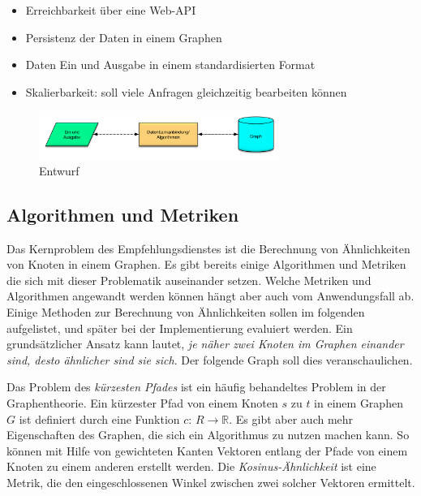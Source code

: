 \begin{itemize}
	\item Erreichbarkeit über eine Web-API 
	\item Persistenz der Daten in einem Graphen	
	\item Daten Ein und Ausgabe in einem standardisierten Format 
	\item Skalierbarkeit: soll viele Anfragen gleichzeitig bearbeiten können
\end{itemize}

\begin{figure}[htb]
 \centering
 \includegraphics[width=0.7\textwidth,angle=0]{abb/Entwurf}
 \caption[Beschreibung]{Entwurf}
\label{fig:Entwurf}
\end{figure}



\subsection{Algorithmen und Metriken}

Das Kernproblem des Empfehlungsdienstes ist die Berechnung von Ähnlichkeiten von Knoten in einem Graphen. Es gibt bereits einige Algorithmen und Metriken die sich mit dieser Problematik auseinander setzen. Welche Metriken und Algorithmen angewandt werden können hängt aber auch vom Anwendungsfall ab. Einige Methoden zur Berechnung von Ähnlichkeiten sollen im folgenden aufgelistet, und später bei der Implementierung evaluiert werden. Ein grundsätzlicher Ansatz kann lautet,\textit{ je näher zwei Knoten im Graphen einander sind, desto ähnlicher sind sie sich}. Der folgende Graph soll dies veranschaulichen. 
\newline

Das Problem des \textit{kürzesten Pfades} ist ein häufig behandeltes Problem in der Graphentheorie. Ein kürzester Pfad von einem Knoten $s$ zu $t$ in einem Graphen $G$ ist definiert durch eine Funktion $c$: $R \rightarrow \mathbb{R}$.
Es gibt aber auch mehr Eigenschaften des Graphen, die sich ein Algorithmus zu nutzen machen kann. So können mit Hilfe von gewichteten Kanten Vektoren entlang der Pfade von einem Knoten zu einem anderen erstellt werden. Die \textit{Kosinus-Ähnlichkeit} ist eine Metrik, die den eingeschlossenen Winkel zwischen zwei solcher Vektoren ermittelt.
\vspace{1em}

